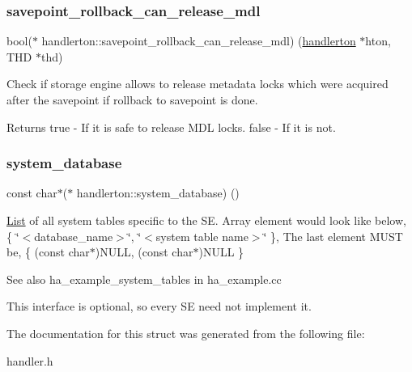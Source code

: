 \subsubsection{\texorpdfstring{savepoint\+\_\+rollback\+\_\+can\+\_\+release\+\_\+mdl}{savepoint\_rollback\_can\_release\_mdl}}
{\footnotesize\ttfamily bool($\ast$ handlerton\+::savepoint\+\_\+rollback\+\_\+can\+\_\+release\+\_\+mdl) (\mbox{\hyperlink{structhandlerton}{handlerton}} $\ast$hton, T\+HD $\ast$thd)}

Check if storage engine allows to release metadata locks which were acquired after the savepoint if rollback to savepoint is done. \begin{DoxyReturn}{Returns}
true -\/ If it is safe to release M\+DL locks. false -\/ If it is not. 
\end{DoxyReturn}
\mbox{\label{structhandlerton_a8d533d8e4139d4385e9d2e2171985447}} 
\subsubsection{\texorpdfstring{system\+\_\+database}{system\_database}}
{\footnotesize\ttfamily const char$\ast$($\ast$ handlerton\+::system\+\_\+database) ()}

\mbox{\hyperlink{classList}{List}} of all system tables specific to the SE. Array element would look like below, \{ \char`\"{}$<$database\+\_\+name$>$\char`\"{}, \char`\"{}$<$system table name$>$\char`\"{} \}, The last element M\+U\+ST be, \{ (const char$\ast$)N\+U\+LL, (const char$\ast$)N\+U\+LL \}

\begin{DoxySeeAlso}{See also}
ha\+\_\+example\+\_\+system\+\_\+tables in ha\+\_\+example.\+cc
\end{DoxySeeAlso}
This interface is optional, so every SE need not implement it. 

The documentation for this struct was generated from the following file\+:\begin{DoxyCompactItemize}
\item 
handler.\+h\end{DoxyCompactItemize}
